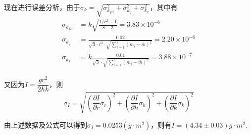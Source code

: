 \documentclass[12pt,a4paper,UTF8]{ctexart}
\begin{document}
现在进行误差分析，由于$\sigma_k=\sqrt{\sigma_{k_{fit}}^2+\sigma_{k_y}^2+\sigma_{k_x}^2}$，其中有
\begin{align*}
	\sigma_{k_{fit}}&=k\sqrt{\frac{1/r^2-1}{8-2}}=3.83\times10^{-6} \\
	\sigma_{k_y}&=\frac{0.02}{\sqrt{3}\cdot t^3\cdot\sqrt{\sum_{i=1}^8(m_i-\bar m)^2}}=2.20\times10^{-6} \\
	\sigma_{k_x}&=k\frac{0.01}{\sqrt{3}\cdot \sqrt{\sum_{i=1}^8(m_i-\bar m)^2}}=3.88\times10^{-7}
\end{align*}
\par
又因为$I=\dfrac{gr^2}{2hk}$，则
\begin{equation*}
\sigma_I=\sqrt{(\frac{\partial I}{\partial r}\sigma_r)^2+(\frac{\partial I}{\partial h}\sigma_h)^2+(\frac{\partial I}{\partial k}\sigma_k)^2}
\end{equation*}
\par
由上述数据及公式可以得到$\sigma_I=0.0253(g\cdot m^2)$，则有$I=(4.34\pm0.03)g\cdot m^2$.
\end{document}
